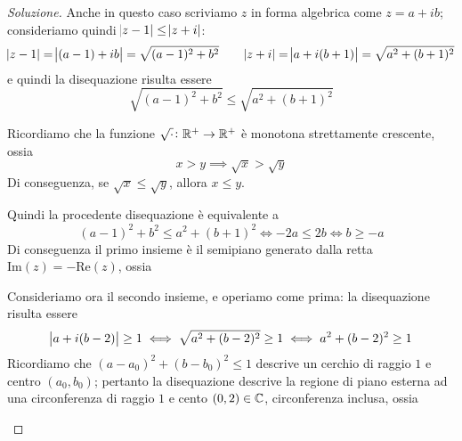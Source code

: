 \begin{proof}[Soluzione]
    Anche in questo caso scriviamo $z$ in forma algebrica come $z=a+ib$; consideriamo quindi $\abs{z-1}\le \abs{z+i}$:
    \[
    \abs{z-1} = \abs{(a-1)+ib} = \sqrt{(a-1)^2 + b^2} \qquad \abs{z+i} = \abs{a+i(b+1)} = \sqrt{a^2+(b+1)^2}
    \] 
    e quindi la disequazione risulta essere
    \[
    \sqrt{(a-1)^2+b^2}\le \sqrt{a^2+(b+1)^2}
    \]
    \begin{tcolorbox}
        Ricordiamo che la funzione $\sqrt{\cdot}\colon \amsbb{R}^+ \to \amsbb{R}^+$ è monotona strettamente crescente, ossia
        \[
        x > y \implies \sqrt{x}>\sqrt{y}
        \]
        Di conseguenza, se $\sqrt{x}\le \sqrt{y}$, allora $x\le y$.
    \end{tcolorbox}
    Quindi la procedente disequazione è equivalente a
    \[
    (a-1)^2+b^2\le a^2+(b+1)^2 \iff -2a \le 2b \iff b \ge -a
    \]
    Di conseguenza il primo insieme è il semipiano generato dalla retta $\mathrm{Im}(z) = -\mathrm{Re}(z)$, ossia
    \begin{center}
    \end{center}
    Consideriamo ora il secondo insieme, e operiamo come prima: la disequazione risulta essere
    \[
    \abs{a+i(b-2)}\ge 1 \iff \sqrt{a^2+(b-2)^2}\ge 1 \iff a^2 +(b-2)^2\ge 1
    \]
    Ricordiamo che $(a-a_0)^2+(b-b_0)^2 \le 1$ descrive un cerchio di raggio $1$ e centro $(a_0, b_0)$; pertanto la disequazione descrive la regione di piano esterna ad una circonferenza di raggio $1$ e cento $(0,2)\in\amsbb{C}$, circonferenza inclusa, ossia
    \begin{center}
\end{center}
\end{proof}
